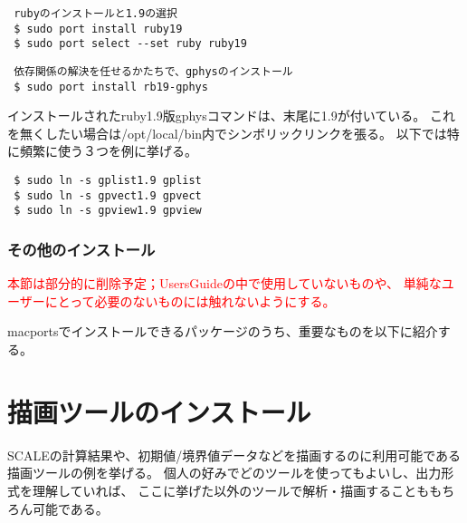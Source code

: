 \begin{verbatim}
 rubyのインストールと1.9の選択
 $ sudo port install ruby19
 $ sudo port select --set ruby ruby19
\end{verbatim}
\begin{verbatim}
 依存関係の解決を任せるかたちで、gphysのインストール
 $ sudo port install rb19-gphys
\end{verbatim}

インストールされたruby1.9版gphysコマンドは、末尾に1.9が付いている。
これを無くしたい場合は/opt/local/bin内でシンボリックリンクを張る。
以下では特に頻繁に使う３つを例に挙げる。
\begin{verbatim}
 $ sudo ln -s gplist1.9 gplist
 $ sudo ln -s gpvect1.9 gpvect
 $ sudo ln -s gpview1.9 gpview
\end{verbatim}

\subsubsection{その他のインストール}

\textcolor{red}{\large 本節は部分的に削除予定；UsersGuideの中で使用していないものや、
単純なユーザーにとって必要のないものには触れないようにする。}

macportsでインストールできるパッケージのうち、重要なものを以下に紹介する。
%


\section{描画ツールのインストール}

SCALEの計算結果や、初期値/境界値データなどを描画するのに利用可能である描画ツールの例を挙げる。
個人の好みでどのツールを使ってもよいし、出力形式を理解していれば、
ここに挙げた以外のツールで解析・描画することももちろん可能である。

